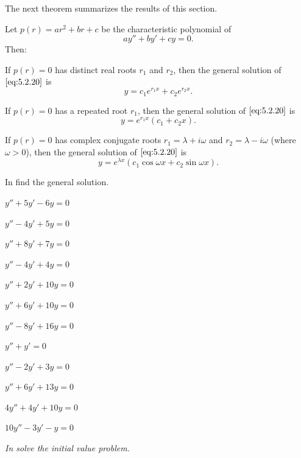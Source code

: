 
The next theorem summarizes the results of this section.

\begin{theorem}\label{thmtype:5.2.1}
Let $p(r)=ar^2+br+c$ be the characteristic polynomial of
\begin{equation} \label{eq:5.2.20}
ay''+by'+cy=0.
\end{equation}
Then:
\begin{alist}
\item %
If $p(r)=0$  has distinct real roots $r_1$ and $r_2$, then the general
solution of $\eqref{eq:5.2.20}$ is
\[
y=c_1e^{r_1x}+c_2e^{r_2x}.
\]
\item %
If $p(r)=0$  has a repeated root  $r_1$, then
the general solution of $\eqref{eq:5.2.20}$ is
\[
y=e^{r_1x}(c_1+c_2x).
\]
\item %
If $p(r)=0$  has complex conjugate roots $r_1=\lambda+i\omega$ and
$r_2=\lambda-i\omega$ (where $\omega>0$), then the general solution
of $\eqref{eq:5.2.20}$ is
\[
y=e^{\lambda x}(c_1\cos\omega x+c_2\sin\omega x).
\]
\end{alist}
\end{theorem}

\exercises
In  find the general solution.

\begin{exerciselistTwoColumn}
\item\label{exer:5.2.1}$y''+5y'-6y=0$
\item\label{exer:5.2.2}$y''-4y'+5y=0$
\item\label{exer:5.2.3}$y''+8y'+7y=0$
\item\label{exer:5.2.4}$y''-4y'+4y=0$
\item\label{exer:5.2.5}$y''+2y'+10y=0$
\item\label{exer:5.2.6}$y''+6y'+10y=0$
\item\label{exer:5.2.7}$y''-8y'+16y=0$
\item\label{exer:5.2.8}$y''+y'=0$
\item\label{exer:5.2.9}$y''-2y'+3y=0$
\item\label{exer:5.2.10}$y''+6y'+13y=0 $
\item\label{exer:5.2.11}$4y''+4y'+10y=0$
\item\label{exer:5.2.12}$10y''-3y'-y=0$
\end{exerciselistTwoColumn}
%
\textsl{In  solve
the initial value problem.}


